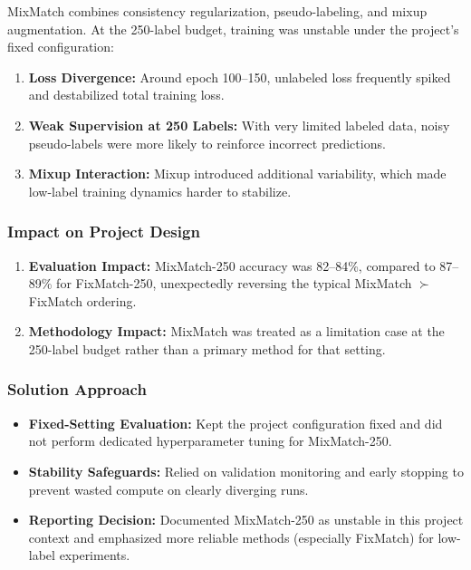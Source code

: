 MixMatch combines consistency regularization, pseudo-labeling, and mixup augmentation. At the 250-label budget, training was unstable under the project's fixed configuration:

\begin{enumerate}
    \item \textbf{Loss Divergence:} Around epoch 100--150, unlabeled loss frequently spiked and destabilized total training loss.

    \item \textbf{Weak Supervision at 250 Labels:} With very limited labeled data, noisy pseudo-labels were more likely to reinforce incorrect predictions.

    \item \textbf{Mixup Interaction:} Mixup introduced additional variability, which made low-label training dynamics harder to stabilize.
\end{enumerate}

\subsubsection{Impact on Project Design}

\begin{enumerate}
    \item \textbf{Evaluation Impact:} MixMatch-250 accuracy was 82--84\%, compared to 87--89\% for FixMatch-250, unexpectedly reversing the typical MixMatch $\succ$ FixMatch ordering.
    
    \item \textbf{Methodology Impact:} MixMatch was treated as a limitation case at the 250-label budget rather than a primary method for that setting.
\end{enumerate}

\subsubsection{Solution Approach}

\begin{itemize}
    \item \textbf{Fixed-Setting Evaluation:} Kept the project configuration fixed and did not perform dedicated hyperparameter tuning for MixMatch-250.

    \item \textbf{Stability Safeguards:} Relied on validation monitoring and early stopping to prevent wasted compute on clearly diverging runs.

    \item \textbf{Reporting Decision:} Documented MixMatch-250 as unstable in this project context and emphasized more reliable methods (especially FixMatch) for low-label experiments.
\end{itemize}

